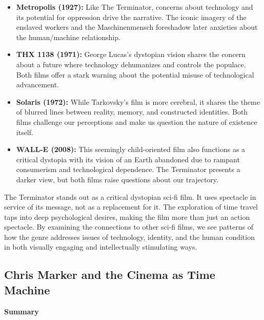 \documentclass[11pt,fleqn]{book}
\begin{document}
\begin{itemize}
\item \textbf{Metropolis (1927):}  Like The Terminator, concerns about technology and its potential for oppression drive the narrative.  The iconic imagery of the enslaved workers and the Maschinenmensch foreshadow later anxieties about the human/machine relationship.  

\item \textbf{THX 1138 (1971):}  George Lucas's dystopian vision shares the concern about a future where technology dehumanizes and controls the populace.  Both films offer a stark warning about the potential misuse of technological advancement.

\item \textbf{Solaris (1972):}  While Tarkovsky's film is more cerebral, it shares the theme of blurred lines between reality, memory, and constructed identities.  Both films challenge our perceptions and make us question the nature of existence itself.

\item \textbf{WALL-E (2008):}  This seemingly child-oriented film also functions as a critical dystopia with its vision of an Earth abandoned due to rampant consumerism and technological dependence.  The Terminator presents a darker view, but both films raise questions about our trajectory.
\end{itemize}

\vspace{5pt}

The Terminator stands out as a critical dystopian sci-fi film.  It uses spectacle in service of its message, not as a replacement for it.  The exploration of time travel taps into deep psychological desires, making the film more than just an action spectacle.  By examining the connections to other sci-fi films, we see patterns of how the genre addresses issues of technology, identity, and the human condition in both visually engaging and intellectually stimulating ways. 




\subsection{Chris Marker and the Cinema as Time Machine}
\textbf{Summary}
\end{document}
